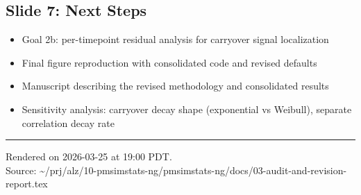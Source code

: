 \documentclass[11pt]{article}
\begin{document}
\subsection{Slide 7: Next Steps}

\begin{itemize}
  \item Goal 2b: per-timepoint residual analysis for carryover signal
    localization
  \item Final figure reproduction with consolidated code and revised
    defaults
  \item Manuscript describing the revised methodology and consolidated
    results
  \item Sensitivity analysis: carryover decay shape (exponential vs
    Weibull), separate correlation decay rate
\end{itemize}

\vfill
\noindent\rule{\textwidth}{0.4pt}
{\footnotesize
Rendered on 2026-03-25 at 19:00 PDT.\\
Source: \textasciitilde/prj/alz/10-pmsimstats-ng/pmsimstats-ng/docs/03-audit-and-revision-report.tex}
\end{document}
